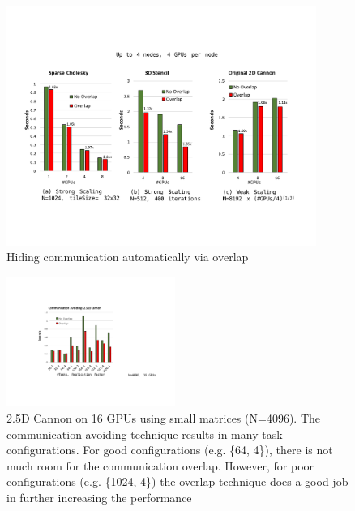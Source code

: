 \begin{figure}[htb]
\centering
\includegraphics[width=0.9\textwidth]{figures/overlap.pdf}
\caption{Hiding communication automatically via overlap
}
\label{overlap}
\end{figure}

\begin{figure}[htb]
\centering
\includegraphics[width=0.49\textwidth]{figures/CA_4096.pdf}
\caption{2.5D Cannon on 16 GPUs using small matrices (N=4096). The communication avoiding technique results in many task configurations. For good configurations (e.g. \{64, 4\}), there is not much room for the communication overlap. However, for poor configurations (e.g. \{1024, 4\}) the overlap technique does a good job in further increasing the performance}
\label{CA_4096}
\end{figure}

